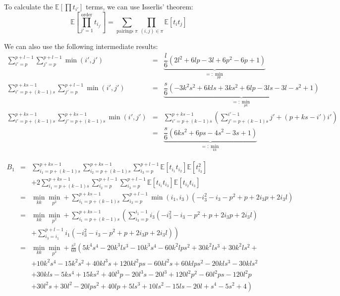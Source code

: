 \documentclass[12pt,a4paper]{article}
\newcommand{\expectation}[1]{\mathbb{E}\left[#1\right]} %
\begin{document}
To calculate the $\expectation{\prod t_{i'}}$ terms, we can use Isserlis' theorem:
$$
\expectation{\prod_{j'=1}^\text{order} t_{i_{j'}}} = \sum_{\text{pairings } \pi}\prod_{(i,j)\in\pi}\expectation{t_{i}t_{j}}
$$

We can also use the following intermediate results:
$$\begin{array}{rcl}
    \sum_{i'=p}^{p+l-1}\sum_{j'=p}^{p+l-1}\min(i',j') & = & \underbrace{\dfrac{l}{6}\left(2 l^{2} + 6 l p - 3 l + 6 p^{2} - 6 p + 1\right)}_{=:\min_{pp}} \\[12pt]
    \sum_{i'=p+(k-1)s}^{p+ks-1}\sum_{j'=p}^{p+l-1}\min(i',j') & = & \underbrace{\dfrac{s}{6}\left(- 3 k^{2} s^{2} + 6 k l s + 3 k s^{2} + 6 l p - 3 l s - 3 l - s^{2} + 1\right)}_{=:\min_{pk}} \\[12pt]
    \sum_{i'=p+(k-1)s}^{p+ks-1}\sum_{j'=p+(k-1)s}^{p+ks-1}\min(i',j') & = & \sum_{i'=p+(k-1)s}^{p+ks-1}\left( \sum_{j'=p+(k-1)s}^{i'-1}j' + (p+ks-i')i' \right) \\[8pt]
    & = & \underbrace{\dfrac{s}{6} \left(6 k s^{2} + 6 p s - 4 s^{2} - 3 s + 1\right)}_{=:\min_{kk}}
\end{array}$$

$$\begin{array}{rcl}
    B_1 & = & \sum_{i_1=p+(k-1)s}^{p+ks-1}\sum_{i_2=p+(k-1)s}^{p+ks-1}\sum_{i_3=p}^{p+l-1}\expectation{t_{i_1}t_{i_2}}\expectation{t_{i_3}^2} \\[8pt]
    && + 2\sum_{i_1=p+(k-1)s}^{p+ks-1}\sum_{i_2=p}^{p+l-1}\sum_{i_3=p}^{p+l-1}\expectation{t_{i_1}t_{i_3}}\expectation{t_{i_2}t_{i_3}} \\[8pt]
    & = & \min_{kk}\min_{p^2} + \sum_{i_1=p+(k-1)s}^{p+ks-1}\sum_{i_3=p}^{p+l-1}\min(i_1,i_3)\left(-i_3^2-i_3-p^2+p+2i_3p+2i_3l\right) \\[8pt]
    & = & \min_{kk}\min_{p^2} + \sum_{i_1=p+(k-1)s}^{p+ks-1}\left(\sum_{i_3=p}^{i_1-1}i_3\left(-i_3^2-i_3-p^2+p+2i_3p+2i_3l\right)\right. \\[8pt]
    && + \left. \sum_{i_3=i_1}^{p+l-1}i_1\left(-i_3^2-i_3-p^2+p+2i_3p+2i_3l\right) \right) \\[8pt]
    & = & \min_{kk}\min_{p^2} + \frac{s^{2}}{60}\left(5 k^{4} s^{4} - 20 k^{3} l s^{3} - 10 k^{3} s^{4} - 60 k^{2} l p s^{2} + 30 k^{2} l s^{3} + 30 k^{2} l s^{2} + \right. \\[4pt]
    && +10 k^{2} s^{4} - 15 k^{2} s^{2} + 40 k l^{3} s + 120 k l^{2} p s - 60 k l^{2} s + 60 k l p s^{2} - 20 k l s^{3} - 30 k l s^{2} \\[4pt]
    && + 30 k l s - 5 k s^{4} + 15 k s^{2} + 40 l^{3} p - 20 l^{3} s - 20 l^{3} + 120 l^{2} p^{2} - 60 l^{2} p s - 120 l^{2} p \\[4pt]
    && \left. + 30 l^{2} s + 30 l^{2} - 20 l p s^{2} + 40 l p + 5 l s^{3} + 10 l s^{2} - 15 l s - 20 l + s^{4} - 5 s^{2} + 4\right)
\end{array}$$
\end{document}

